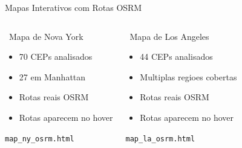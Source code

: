 \documentclass[aspectratio=169,9pt]{beamer}
\begin{document}
\begin{frame}{Mapas Interativos com Rotas OSRM}
\begin{columns}
\begin{block}{\faMap\ Mapa de Nova York}
\begin{itemize}
    \item 70 CEPs analisados
    \item 27 em Manhattan
    \item Rotas reais OSRM
    \item Rotas aparecem no hover
\end{itemize}
\vspace{0.5em}
\footnotesize{\texttt{map\_ny\_osrm.html}}
\end{block}

\begin{block}{\faMap\ Mapa de Los Angeles}
\begin{itemize}
    \item 44 CEPs analisados
    \item Multiplas regioes cobertas
    \item Rotas reais OSRM
    \item Rotas aparecem no hover
\end{itemize}
\vspace{0.5em}
\footnotesize{\texttt{map\_la\_osrm.html}}
\end{block}
\end{columns}

\vspace{0.8em}
\begin{center}
\end{center}
\end{frame}
\end{document}
